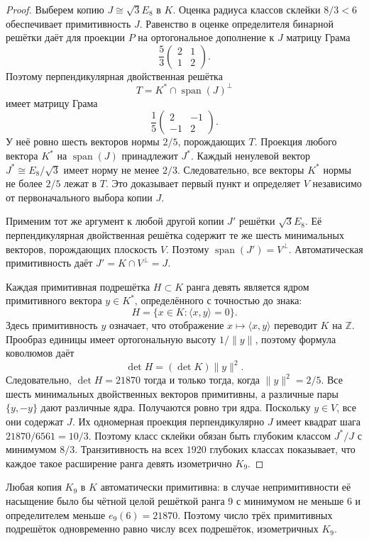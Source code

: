 \documentclass[11pt,a4paper]{article}
\theoremstyle{remark}\newtheorem{remark}[theorem]{Замечание}
\begin{document}
\begin{proof}
Выберем копию $J\cong\sqrt3E_8$ в $K$. Оценка радиуса классов
склейки $8/3<6$ обеспечивает примитивность $J$. Равенство в оценке
определителя бинарной решётки даёт для проекции $P$ на ортогональное
дополнение к $J$ матрицу Грама
\[
 \frac53\begin{pmatrix}2&1\\1&2\end{pmatrix}.
\]
Поэтому перпендикулярная двойственная решётка
\[
 T=K^*\cap\operatorname{span}(J)^\perp
\]
имеет матрицу Грама
\[
 \frac15\begin{pmatrix}2&-1\\-1&2\end{pmatrix}.
\]
У неё ровно шесть векторов нормы $2/5$, порождающих $T$.
Проекция любого вектора $K^*$ на $\operatorname{span}(J)$ принадлежит
$J^*$. Каждый ненулевой вектор $J^*\cong E_8/\sqrt3$ имеет норму
не менее $2/3$. Следовательно, все векторы $K^*$ нормы не более
$2/5$ лежат в $T$. Это доказывает первый пункт и определяет $V$
независимо от первоначального выбора копии $J$.

Применим тот же аргумент к любой другой копии $J'$ решётки
$\sqrt3E_8$. Её перпендикулярная двойственная решётка содержит те же
шесть минимальных векторов, порождающих плоскость $V$. Поэтому
$\operatorname{span}(J')=V^\perp$. Автоматическая примитивность даёт
$J'=K\cap V^\perp=J$.

Каждая примитивная подрешётка $H\subset K$ ранга девять является ядром
примитивного вектора $y\in K^*$, определённого с точностью до знака:
\[
 H=\{x\in K:\langle x,y\rangle=0\}.
\]
Здесь примитивность $y$ означает, что отображение
$x\mapsto\langle x,y\rangle$ переводит $K$ на $\mathbb Z$.
Прообраз единицы имеет ортогональную высоту $1/\|y\|$, поэтому
формула коволюмов даёт
\[
 \det H=(\det K)\|y\|^2.
\]
Следовательно, $\det H=21870$ тогда и только тогда, когда
$\|y\|^2=2/5$. Все шесть минимальных двойственных векторов
примитивны, а различные пары $\{y,-y\}$ дают различные ядра.
Получаются ровно три ядра. Поскольку $y\in V$, все они содержат $J$.
Их одномерная проекция перпендикулярно $J$ имеет квадрат шага
$21870/6561=10/3$. Поэтому класс склейки обязан быть глубоким
классом $J^*/J$ с минимумом $8/3$. Транзитивность на всех $1920$
глубоких классах показывает, что каждое такое расширение ранга девять
изометрично $K_9$.
\end{proof}

Любая копия $K_9$ в $K$ автоматически примитивна: в случае непримитивности её насыщение было бы чётной целой решёткой ранга 9 с минимумом не меньше 6 и определителем меньше $e_9(6)=21870$. Поэтому число трёх примитивных подрешёток одновременно равно числу всех подрешёток, изометричных $K_9$.
\end{document}
